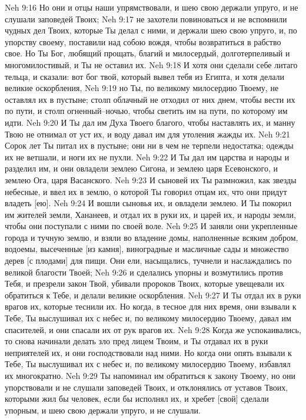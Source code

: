 Neh 9:16  Но они и отцы наши упрямствовали, и шею свою держали упруго, и не слушали заповедей Твоих;
Neh 9:17  не захотели повиноваться и не вспомнили чудных дел Твоих, которые Ты делал с ними, и держали шею свою упруго, и, по упорству своему, поставили над собою вождя, чтобы возвратиться в рабство свое. Но Ты Бог, любящий прощать, благий и милосердый, долготерпеливый и многомилостивый, и Ты не оставил их.
Neh 9:18  И хотя они сделали себе литаго тельца, и сказали: вот бог твой, который вывел тебя из Египта, и хотя делали великие оскорбления,
Neh 9:19  но Ты, по великому милосердию Твоему, не оставлял их в пустыне; столп облачный не отходил от них днем, чтобы вести их по пути, и столп огненный--ночью, чтобы светить им на пути, по которому им идти.
Neh 9:20  И Ты дал им Духа Твоего благого, чтобы наставлять их, и манну Твою не отнимал от уст их, и воду давал им для утоления жажды их.
Neh 9:21  Сорок лет Ты питал их в пустыне; они ни в чем не терпели недостатка; одежды их не ветшали, и ноги их не пухли.
Neh 9:22  И Ты дал им царства и народы и разделил им, и они овладели землею Сигона, и землею царя Есевонского, и землею Ога, царя Васанского.
Neh 9:23  И сыновей их Ты размножил, как звезды небесные, и ввел их в землю, о которой Ты говорил отцам их, что они придут владеть [ею].
Neh 9:24  И вошли сыновья их, и овладели землею. И Ты покорил им жителей земли, Хананеев, и отдал их в руки их, и царей их, и народы земли, чтобы они поступали с ними по своей воле.
Neh 9:25  И заняли они укрепленные города и тучную землю, и взяли во владение домы, наполненные всяким добром, водоемы, высеченные [из камня], виноградные и масличные сады и множество дерев [с плодами] для пищи. Они ели, насыщались, тучнели и наслаждались по великой благости Твоей;
Neh 9:26  и сделались упорны и возмутились против Тебя, и презрели закон Твой, убивали пророков Твоих, которые увещевали их обратиться к Тебе, и делали великие оскорбления.
Neh 9:27  И Ты отдал их в руки врагов их, которые теснили их. Но когда, в тесное для них время, они взывали к Тебе, Ты выслушивал их с небес и, по великому милосердию Твоему, давал им спасителей, и они спасали их от рук врагов их.
Neh 9:28  Когда же успокаивались, то снова начинали делать зло пред лицем Твоим, и Ты отдавал их в руки неприятелей их, и они господствовали над ними. Но когда они опять взывали к Тебе, Ты выслушивал их с небес и, по великому милосердию Твоему, избавлял их многократно.
Neh 9:29  Ты напоминал им обратиться к закону Твоему, но они упорствовали и не слушали заповедей Твоих, и отклонялись от уставов Твоих, которыми жил бы человек, если бы исполнял их, и хребет [свой] сделали упорным, и шею свою держали упруго, и не слушали.
